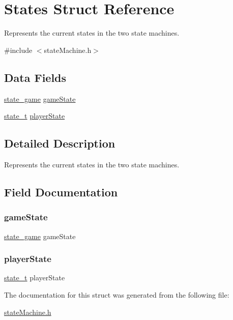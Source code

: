 \hypertarget{struct_states}{}\section{States Struct Reference}
\label{struct_states}


Represents the current states in the two state machines.  




{\ttfamily \#include $<$state\+Machine.\+h$>$}

\subsection*{Data Fields}
\begin{DoxyCompactItemize}
\item 
\hyperlink{group___state_machine_ga923762042f3074402fbf32bc96074164}{state\+\_\+game} \hyperlink{struct_states_a8fc1759ee01460abbd50ff73bb10f09a}{game\+State}
\item 
\hyperlink{group___state_machine_gaa0aafed44fec19806d8f9ad834be1248}{state\+\_\+t} \hyperlink{struct_states_abe304d8f77d7d794b279f159b08df6de}{player\+State}
\end{DoxyCompactItemize}


\subsection{Detailed Description}
Represents the current states in the two state machines. 

\subsection{Field Documentation}
\mbox{\label{struct_states_a8fc1759ee01460abbd50ff73bb10f09a}} 
\subsubsection{\texorpdfstring{game\+State}{gameState}}
{\footnotesize\ttfamily \hyperlink{group___state_machine_ga923762042f3074402fbf32bc96074164}{state\+\_\+game} game\+State}

\mbox{\label{struct_states_abe304d8f77d7d794b279f159b08df6de}} 
\subsubsection{\texorpdfstring{player\+State}{playerState}}
{\footnotesize\ttfamily \hyperlink{group___state_machine_gaa0aafed44fec19806d8f9ad834be1248}{state\+\_\+t} player\+State}



The documentation for this struct was generated from the following file\+:\begin{DoxyCompactItemize}
\item 
\hyperlink{state_machine_8h}{state\+Machine.\+h}\end{DoxyCompactItemize}
